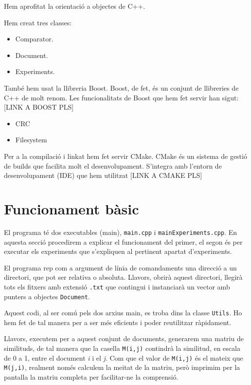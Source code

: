 \documentclass[catalan, 12pt]{report}
\begin{document}
Hem aprofitat la orientació a objectes de C++.

Hem creat tres classes:

\begin{itemize}
\item Comparator.
\item Document.
\item Experiments.
\end{itemize}


També hem usat la llibreria Boost. Boost, de fet, és un conjunt de llibreries de C++ de molt renom. Les funcionalitats de Boost que hem fet servir han sigut: [LINK A BOOST PLS]

\begin{itemize}
\item CRC
\item Filesystem
\end{itemize}

Per a la compilació i linkat hem fet servir CMake. CMake és un sistema de gestió de builds que facilita molt el desenvolupament. S'integra amb l'entorn de desenvolupament (IDE) que hem utilitzat [LINK A CMAKE PLS]

\section{Funcionament bàsic}

El programa té dos executables (main), \verb|main.cpp| i \verb|mainExperiments.cpp|. En aquesta secció procedirem a explicar el funcionament del primer, el segon és per executar els experiments que s'expliquen al pertinent apartat d'experiments.

El programa rep com a argument de línia de comandaments una direcció a un directori, que pot ser relativa o absoluta. Llavors, obrirà aquest directori, llegirà tots els fitxers amb extensió \verb|.txt| que contingui i instanciarà un vector amb punters a objectes \verb|Document|.

Aquest codi, al ser comú pels dos arxius main, es troba dins la classe \verb|Utils|. Ho hem fet de tal manera per a ser més eficients i poder reutilitzar ràpidament.

Llavors, executem per a aquest conjunt de documents, generarem una matriu de similituds, de tal manera que la casella \verb|M(i,j)| contindrà la similitud, en escala de 0 a 1, entre el document \textit{i} i el \textit{j}. Com que el valor de \verb|M(i,j)| és el mateix que \verb|M(j,i)|, realment només calculem la meitat de la matriu, però imprimim per la pantalla la matriu completa per facilitar-ne la comprensió.
\end{document}
